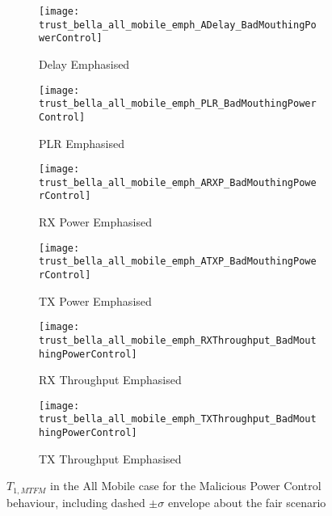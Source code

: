 \begin{figure}[h]
	\centering
	\begin{subfigure}{0.45\textwidth}
		\texttt{[image: trust\_bella\_all\_mobile\_emph\_ADelay\_BadMouthingPowerControl]} 
		\caption{Delay Emphasised}
    \label{fig:all_mobile_badmouthing_delay}
	\end{subfigure}
	\begin{subfigure}{0.45\textwidth}
		\texttt{[image: trust\_bella\_all\_mobile\_emph\_PLR\_BadMouthingPowerControl]} 
		\caption{PLR Emphasised}
    \label{fig:all_mobile_badmouthing_plr}
	\end{subfigure}
	
	\begin{subfigure}{0.45\textwidth}
		\texttt{[image: trust\_bella\_all\_mobile\_emph\_ARXP\_BadMouthingPowerControl]} 
		\caption{RX Power Emphasised}
    \label{fig:all_mobile_badmouthing_rxp}
	\end{subfigure}	
	\begin{subfigure}{0.45\textwidth}
		\texttt{[image: trust\_bella\_all\_mobile\_emph\_ATXP\_BadMouthingPowerControl]} 
		\caption{TX Power Emphasised}
    \label{fig:all_mobile_badmouthing_txp}
	\end{subfigure}
	
	\begin{subfigure}{0.45\textwidth}
		\texttt{[image: trust\_bella\_all\_mobile\_emph\_RXThroughput\_BadMouthingPowerControl]} 
		\caption{RX Throughput Emphasised}
    \label{fig:all_mobile_badmouthing_rxthroughput}
	\end{subfigure}
	\begin{subfigure}{0.45\textwidth}
		\texttt{[image: trust\_bella\_all\_mobile\_emph\_TXThroughput\_BadMouthingPowerControl]} 
		\caption{TX Throughput Emphasised}
    \label{fig:all_mobile_badmouthing_txthroughput}
	\end{subfigure}
	\caption{$T_{1,MTFM}$ in the All Mobile case for the Malicious Power Control behaviour, including dashed $\pm\sigma$ envelope about the fair scenario}
	\label{fig:all_mobile_badmouthing}
\end{figure}
%
